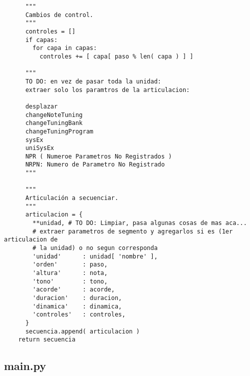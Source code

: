 \documentclass[]{article}
\begin{document}
\begin{verbatim}
      """
      Cambios de control.
      """
      controles = []
      if capas:
        for capa in capas:
          controles += [ capa[ paso % len( capa ) ] ]

      """
      TO DO: en vez de pasar toda la unidad: 
      extraer solo los paramtros de la articulacion:

      desplazar
      changeNoteTuning
      changeTuningBank
      changeTuningProgram
      sysEx
      uniSysEx
      NPR ( Numeroe Parametros No Registrados )
      NRPN: Numero de Parametro No Registrado 
      """

      """
      Articulación a secuenciar.
      """
      articulacion = {
        **unidad, # TO DO: Limpiar, pasa algunas cosas de mas aca...
        # extraer parametros de segmento y agregarlos si es (1er articulacion de
        # la unidad) o no segun corresponda 
        'unidad'      : unidad[ 'nombre' ],
        'orden'       : paso,
        'altura'      : nota,
        'tono'        : tono,
        'acorde'      : acorde,
        'duracion'    : duracion,
        'dinamica'    : dinamica,
        'controles'   : controles,
      }
      secuencia.append( articulacion )
    return secuencia 
\end{verbatim}

\hypertarget{main.py}{%
\subsection{main.py}\label{main.py}}
\end{document}

